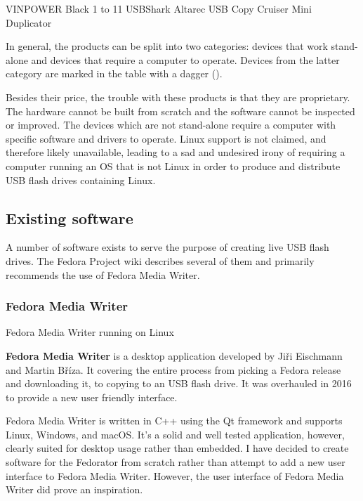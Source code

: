                 {VINPOWER Black 1 to 11 USBShark \cite{product-vinpower-11}}
                {Altarec USB Copy Cruiser Mini Duplicator \cite{product-altarec-10}}
            
            In general, the products can be split into two categories: devices that work stand-alone and devices that require a computer to operate.  Devices from the latter category are marked in the table with a dagger (\textdagger).
            
            Besides their price, the trouble with these products is that they are proprietary.  The hardware cannot be built from scratch and the software cannot be inspected or improved.  The devices which are not stand-alone require a computer with specific software and drivers to operate.  Linux support is not claimed, and therefore likely unavailable, leading to a sad and undesired irony of requiring a computer running an OS that is not Linux in order to produce and distribute USB flash drives containing Linux.
        \subsection{Existing software}
            A number of software exists to serve the purpose of creating live USB flash drives.  The Fedora Project wiki describes several of them and primarily recommends the use of Fedora Media Writer\cite{fedora-how-to-live-usb}.
            
            \subsubsection{Fedora Media Writer}
                    {Fedora Media Writer running on Linux \cite{fedora-media-writer-screenshot}}
                
                \textbf{Fedora Media Writer} is a desktop application developed by  Jiři Eischmann and Martin Bříza.  It covering the entire process from picking a Fedora release and downloading it, to copying to an USB flash drive.  It was overhauled in 2016 to provide a new user friendly interface\cite{fedora-luc-as-primary-downloadable}.
                
                Fedora Media Writer is written in C++ using the Qt framework and supports Linux, Windows, and macOS\cite{fedora-media-writer}.  It's a solid and well tested application, however, clearly suited for desktop usage rather than embedded.  I have decided to create software for the Fedorator from scratch rather than attempt to add a new user interface to Fedora Media Writer.  However, the user interface of Fedora Media Writer did prove an inspiration.
                
